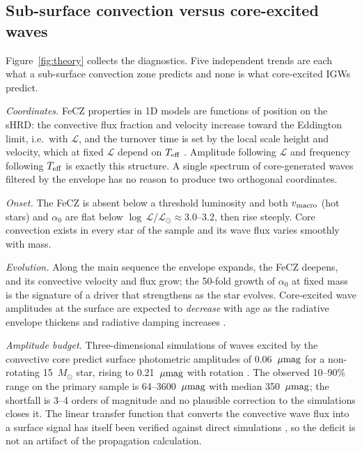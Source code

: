 \documentclass[twocolumn]{aastex631}
\newcommand{\vmac}{v_{\rm macro}}
\newcommand{\teff}{T_{\rm eff}}
\renewcommand{\ell}{\mathcal{L}}
\newcommand{\lgL}{\log\,\ell/\ell_\odot}
\newcommand{\umag}{\mu{\rm mag}}
\begin{document}
\subsection{Sub-surface convection versus core-excited waves}\label{sec:fecz_vs_igw}

Figure~\ref{fig:theory} collects the diagnostics. Five independent trends are each what a sub-surface convection zone predicts and none is what core-excited IGWs predict.

\emph{Coordinates.} FeCZ properties in 1D models are functions of position on the sHRD: the convective flux fraction and velocity increase toward the Eddington limit, i.e.\ with $\ell$, and the turnover time is set by the local scale height and velocity, which at fixed $\ell$ depend on $\teff$ \citep{cantiello2021}. Amplitude following $\ell$ and frequency following $\teff$ is exactly this structure. A single spectrum of core-generated waves filtered by the envelope has no reason to produce two orthogonal coordinates.

\emph{Onset.} The FeCZ is absent below a threshold luminosity and both $\vmac$ (hot stars) and $\alpha_0$ are flat below $\lgL\approx3.0$--3.2, then rise steeply. Core convection exists in every star of the sample and its wave flux varies smoothly with mass.

\emph{Evolution.} Along the main sequence the envelope expands, the FeCZ deepens, and its convective velocity and flux grow; the 50-fold growth of $\alpha_0$ at fixed mass is the signature of a driver that strengthens as the star evolves. Core-excited wave amplitudes at the surface are expected to \emph{decrease} with age as the radiative envelope thickens and radiative damping increases \citep{ratnasingam2020,anders2023}.

\emph{Amplitude budget.} Three-dimensional simulations of waves excited by the convective core predict surface photometric amplitudes of 0.06~$\umag$ for a non-rotating 15~$M_\odot$ star, rising to 0.21~$\umag$ with rotation \citep{anders2023}. The observed 10--90\% range on the primary sample is 64--3600~$\umag$ with median 350~$\umag$; the shortfall is 3--4 orders of magnitude and no plausible correction to the simulations closes it. The linear transfer function that converts the convective wave flux into a surface signal has itself been verified against direct simulations \citep{lecoanet2021}, so the deficit is not an artifact of the propagation calculation.
\end{document}

